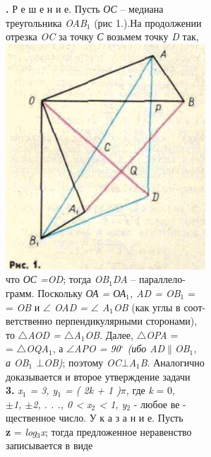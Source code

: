 \newpage
\begin{minipage}[b]{0.40\textwidth}
	\normalsize \textbf{.} %
	Р е ш е н и е.    Пусть \textit{ОС} -- медиана\\
	треугольника \textit{OAB$_1$}
        (рис 1.).На продолжении\\
	отрезка \textit{OC} за точку \textit{С} возьмем точку \textit{D} так,\\

	\includegraphics[width=7.5cm]{Lab7_1.png}\\

	\normalsize что \textit{ОС =OD}; тогда \textit{OB$_1$DA} -- параллело-\\
	грамм. Поскольку \textit{ОА = ОА$_1$, AD = OB$_1$} =\\
	= \textit{OB} и  \textit{$\angle$ OAD = $\angle$ A$_1$OB} (как углы в соот-\\
	ветственно перпендикулярными сторонами),\\
	то \textit{$\triangle$AOD = $\triangle$A$_1$OB}. Далее,  \textit{$\triangle$OPA} =\\
	=  \textit{$\triangle$OQA$_1$}, а \textit{$\angle$APO = 90$^\circ$ (ибо AD$\|$OB$_1$,\\
	а OB$_1$ $\bot$OB)}; поэтому \textit{OC$\bot$A$_1$B}. Аналогично\\
	доказывается и второе утверждение задачи \\
	\hphantom \qquad  \textbf{3.} \textit{x$_1$ = 3, y$_1$ = ( 2k + 1 )$\pi$}, где \textit{k} = 0, \\
	\textit{$\pm$1, $\pm$2, . . ., 0 < x$_2$ < 1, y$_2$}  - любое ве -\\
	щественное число. \quad У к а з а н и е.  Пусть\\
	\textbf{z} = \textit{log$_3$x}; тогда предложенное неравенство\\
	записывается в виде


\end{minipage}
